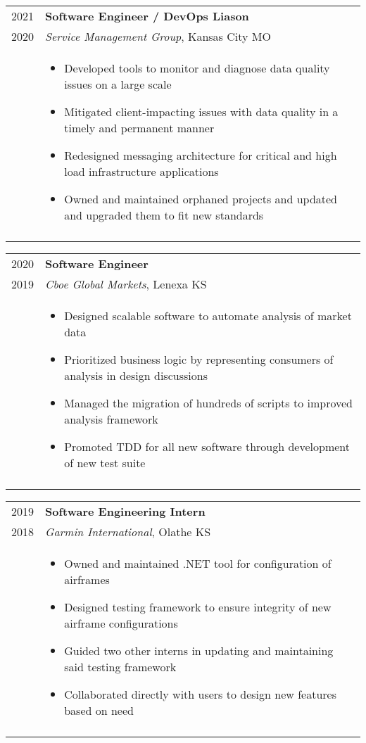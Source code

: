 \documentclass[a4paper,10pt]{article}
\newcommand{\br}{\\\multicolumn{2}{c}{}}
\begin{document}
\begin{tabular}{r|p{15cm}}
    \textsc{2021}  & \textbf{Software Engineer / DevOps Liason} \\
    \textsc{2020}  & \textit{Service Management Group}, Kansas City MO \\ &
    \begin{itemize}
    \item Developed tools to monitor and diagnose data quality issues on a large scale
    \item Mitigated client-impacting issues with data quality in a timely and permanent manner
    \item Redesigned messaging architecture for critical and high load infrastructure applications
    \item Owned and maintained orphaned projects and updated and upgraded them to fit new standards

    \end{itemize} \br\\

\end{tabular}

\begin{tabular}{r|p{15cm}}
    \textsc{2020}   & \textbf{Software Engineer} \\
    \textsc{2019}  & \textit{Cboe Global Markets}, Lenexa KS \\ &
    \begin{itemize}
    \item Designed scalable software to automate analysis of market data
    \item Prioritized business logic by representing consumers of analysis in design discussions
    \item Managed the migration of hundreds of scripts to improved analysis framework
    \item Promoted TDD for all new software through development of new test suite

    \end{itemize} \br\\

\end{tabular}

\begin{tabular}{r|p{15cm}}
    \textsc{2019} & \textbf{Software Engineering Intern} \\
    \textsc{2018} & \textit{Garmin International}, Olathe KS \\ &
    \begin{itemize}
    \item Owned and maintained .NET tool for configuration of airframes
    \item Designed testing framework to ensure integrity of new airframe configurations
    \item Guided two other interns in updating and maintaining said testing framework
    \item Collaborated directly with users to design new features based on need
    \end{itemize} \br\\

\end{tabular}
\end{document}
